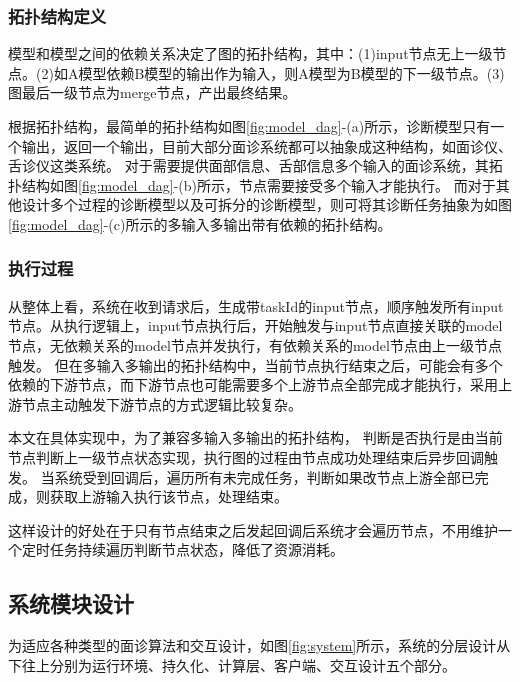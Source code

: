 \subsubsection{拓扑结构定义}
模型和模型之间的依赖关系决定了图的拓扑结构，其中：(1)input节点无上一级节点。(2)如A模型依赖B模型的输出作为输入，则A模型为B模型的下一级节点。(3)图最后一级节点为merge节点，产出最终结果。

根据拓扑结构，最简单的拓扑结构如图\ref{fig:model_dag}-(a)所示，诊断模型只有一个输出，返回一个输出，目前大部分面诊系统都可以抽象成这种结构，如面诊仪、舌诊仪这类系统。
对于需要提供面部信息、舌部信息多个输入的面诊系统，其拓扑结构如图\ref{fig:model_dag}-(b)所示，节点需要接受多个输入才能执行。
而对于其他设计多个过程的诊断模型以及可拆分的诊断模型，则可将其诊断任务抽象为如图\ref{fig:model_dag}-(c)所示的多输入多输出带有依赖的拓扑结构。

\subsubsection{执行过程}

从整体上看，系统在收到请求后，生成带taskId的input节点，顺序触发所有input节点。从执行逻辑上，input节点执行后，开始触发与input节点直接关联的model节点，无依赖关系的model节点并发执行，有依赖关系的model节点由上一级节点触发。
但在多输入多输出的拓扑结构中，当前节点执行结束之后，可能会有多个依赖的下游节点，而下游节点也可能需要多个上游节点全部完成才能执行，采用上游节点主动触发下游节点的方式逻辑比较复杂。

本文在具体实现中，为了兼容多输入多输出的拓扑结构，
判断是否执行是由当前节点判断上一级节点状态实现，执行图的过程由节点成功处理结束后异步回调触发。
当系统受到回调后，遍历所有未完成任务，判断如果改节点上游全部已完成，则获取上游输入执行该节点，处理结束。

这样设计的好处在于只有节点结束之后发起回调后系统才会遍历节点，不用维护一个定时任务持续遍历判断节点状态，降低了资源消耗。


\subsection{系统模块设计}
为适应各种类型的面诊算法和交互设计，如图\ref{fig:system}所示，系统的分层设计从下往上分别为运行环境、持久化、计算层、客户端、交互设计五个部分。

